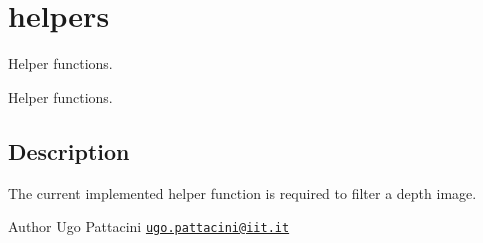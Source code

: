 \section{helpers}
\label{group__helpers}


Helper functions.  


Helper functions. 

\hypertarget{group__skeletonViewer_intro_sec}{}\subsection{Description}\label{group__skeletonViewer_intro_sec}
The current implemented helper function is required to filter a depth image.

\begin{DoxyAuthor}{Author}
Ugo Pattacini \href{mailto:ugo.pattacini@iit.it}{\tt ugo.\+pattacini@iit.\+it} 
\end{DoxyAuthor}

